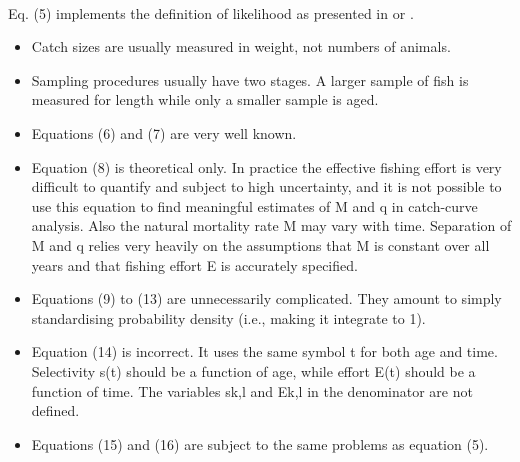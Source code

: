 \documentclass[11pt]{article}
\begin{document}
\begin{spacing}{1.2}
{ \\
Eq. (5) implements the definition of likelihood as presented in \citep{edwards1992likelihood} or \citep{pawitan2013all}. 

\begin{itemize}
\item Catch sizes are usually measured in weight, not numbers of animals.
\item Sampling procedures usually have two stages.  A larger sample of fish is measured for length while only a smaller sample is aged.
\item Equations (6) and (7) are very well known.
\item Equation (8) is theoretical only.  In practice the effective fishing effort is very difficult to quantify and subject to high uncertainty, and it is not possible to use this equation to find meaningful estimates of M and q in catch-curve analysis.  Also the natural mortality rate M may vary with time.  Separation of M and q relies very heavily on the assumptions that M is constant over all years and that fishing effort E is accurately specified.

\item Equations (9) to (13) are unnecessarily complicated.  They amount to simply standardising probability density (i.e., making it integrate to 1).

\item Equation (14) is incorrect.  It uses the same symbol t for both age and time.  Selectivity s(t) should be a function of age, while effort E(t) should be a function of time.  The variables sk,l and Ek,l in the denominator are not defined.

\item Equations (15) and (16) are subject to the same problems as equation (5).


\end{itemize}}
\end{spacing}
\end{document}
